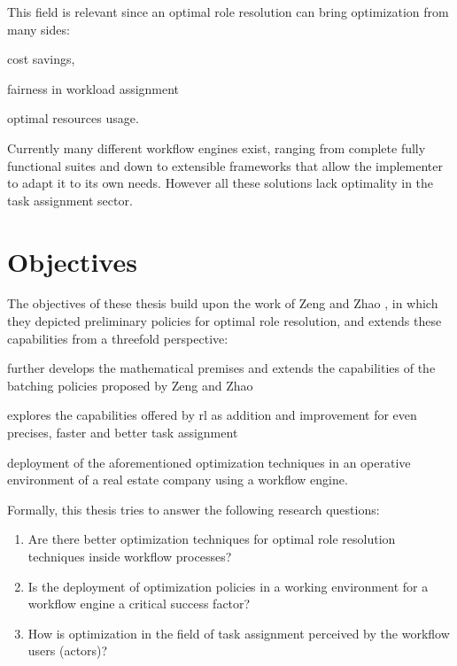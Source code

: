 \documentclass{seal_thesis}
\begin{document}
This field is relevant since an optimal role resolution can bring optimization from many sides:
\begin{enumerate*}
	\item cost savings,
	\item fairness in workload assignment
	\item optimal resources usage.
\end{enumerate*}

Currently many different workflow engines exist, ranging from complete fully functional suites and down to extensible frameworks that allow the implementer to adapt it to its own needs. However all these solutions lack optimality in the task assignment sector.

\section{Objectives}
\label{sec:objectives}

The objectives of these thesis build upon the work of Zeng and Zhao \cite{Zeng2005}, in which they depicted preliminary policies for optimal role resolution, and extends these capabilities from a threefold perspective:
\begin{enumerate*}
	\item further develops the mathematical premises and extends the capabilities of the batching policies proposed by Zeng and Zhao
	\item explores the capabilities offered by \gls{rl} as addition and improvement for even precises, faster and better task assignment
	\item deployment of the aforementioned optimization techniques in an operative environment of a real estate company using a workflow engine.
\end{enumerate*}

Formally, this thesis tries to answer the following research questions:

\begin{enumerate}
	\item Are there better optimization techniques for optimal role resolution techniques inside workflow processes?
	\item Is the deployment of optimization policies in a working environment for a workflow engine a critical success factor?
	\item How is optimization in the field of task assignment perceived by the workflow users (actors)?
\end{enumerate}
\end{document}

